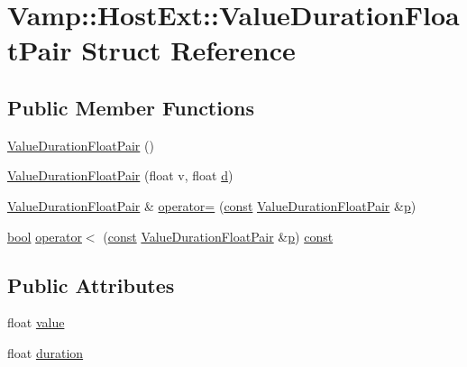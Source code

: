 \hypertarget{struct_vamp_1_1_host_ext_1_1_value_duration_float_pair}{}\section{Vamp\+:\+:Host\+Ext\+:\+:Value\+Duration\+Float\+Pair Struct Reference}
\label{struct_vamp_1_1_host_ext_1_1_value_duration_float_pair}
\subsection*{Public Member Functions}
\begin{DoxyCompactItemize}
\item 
\hyperlink{struct_vamp_1_1_host_ext_1_1_value_duration_float_pair_aa4907a46f568b69fbc1903ec456a77a5}{Value\+Duration\+Float\+Pair} ()
\item 
\hyperlink{struct_vamp_1_1_host_ext_1_1_value_duration_float_pair_af83fcbc9d4b640d8f49a87ccd2844e8b}{Value\+Duration\+Float\+Pair} (float v, float \hyperlink{poly-fir_8h_a2530554172d8629149ec56816eeaa947}{d})
\item 
\hyperlink{struct_vamp_1_1_host_ext_1_1_value_duration_float_pair}{Value\+Duration\+Float\+Pair} \& \hyperlink{struct_vamp_1_1_host_ext_1_1_value_duration_float_pair_af86d8f888b1fbaa5ff0273df2e0c981d}{operator=} (\hyperlink{getopt1_8c_a2c212835823e3c54a8ab6d95c652660e}{const} \hyperlink{struct_vamp_1_1_host_ext_1_1_value_duration_float_pair}{Value\+Duration\+Float\+Pair} \&\hyperlink{xmltok_8h_a94b60f3beb36ae85555d36dc9816769c}{p})
\item 
\hyperlink{mac_2config_2i386_2lib-src_2libsoxr_2soxr-config_8h_abb452686968e48b67397da5f97445f5b}{bool} \hyperlink{struct_vamp_1_1_host_ext_1_1_value_duration_float_pair_a47d97fba9b179e43cea72ecb0a77b971}{operator$<$} (\hyperlink{getopt1_8c_a2c212835823e3c54a8ab6d95c652660e}{const} \hyperlink{struct_vamp_1_1_host_ext_1_1_value_duration_float_pair}{Value\+Duration\+Float\+Pair} \&\hyperlink{xmltok_8h_a94b60f3beb36ae85555d36dc9816769c}{p}) \hyperlink{getopt1_8c_a2c212835823e3c54a8ab6d95c652660e}{const} 
\end{DoxyCompactItemize}
\subsection*{Public Attributes}
\begin{DoxyCompactItemize}
\item 
float \hyperlink{struct_vamp_1_1_host_ext_1_1_value_duration_float_pair_a3e2e0e9012e5bf2139b32df0a3464451}{value}
\item 
float \hyperlink{struct_vamp_1_1_host_ext_1_1_value_duration_float_pair_a4ad4ef7240e419036ee3fd91db579fea}{duration}
\end{DoxyCompactItemize}


